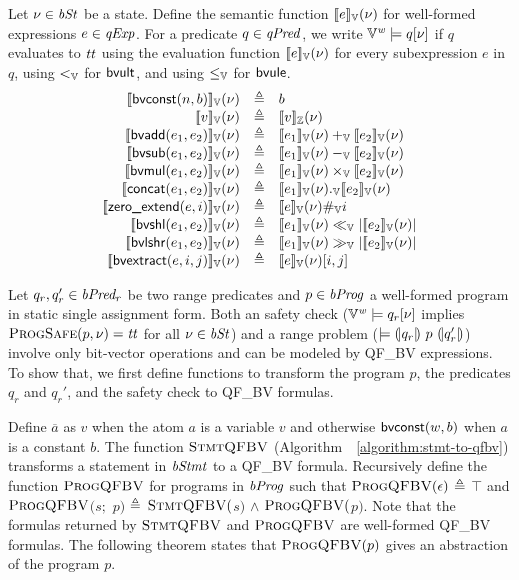 Let $\nu \in \mathit{bSt}$ be a state.
Define the semantic function $[\![{e}]\!]_{\mathbb{V}}(\nu)$ for well-formed expressions $e \in \mathit{qExp}$.
For a predicate $q \in \mathit{qPred}$, we write $\mathbb{V}^{\mathit{w}} \models q[\nu]$ if $q$ evaluates to $\mathit{tt}$ using the evaluation function $[\![{e}]\!]_{\mathbb{V}}(\nu)$ for every subexpression $e$ in $q$, using $<_{\mathbb{V}}$ for $\mbox{\textsf{bvult}}$, and using $\leq_{\mathbb{V}}$ for $\mbox{\textsf{bvule}}$.
\[
\begin{array}{rcl}
\bvvalueof{\bvconst(n, b)}(\bvst) & \defn & b \\
\bvvalueof{v}(\bvst) & \defn & \zvalueof{v}(\bvst) \\
\bvvalueof{\bvadd(e_1, e_2)}(\bvst) & \defn & \bvvalueof{e_1}(\bvst) +_\BV \bvvalueof{e_2}(\bvst) \\
\bvvalueof{\bvsub(e_1, e_2)}(\bvst) & \defn & \bvvalueof{e_1}(\bvst) -_\BV \bvvalueof{e_2}(\bvst) \\
\bvvalueof{\bvmul(e_1, e_2)}(\bvst) & \defn & \bvvalueof{e_1}(\bvst) \times_\BV \bvvalueof{e_2}(\bvst) \\
\bvvalueof{\bvconcat(e_1, e_2)}(\bvst) & \defn & \bvvalueof{e_1}(\bvst) ._\BV \bvvalueof{e_2}(\bvst) \\
\bvvalueof{\bvext(e, i)}(\bvst) & \defn & \bvvalueof{e}(\bvst) \#_\BV i \\
\bvvalueof{\bvshl(e_1, e_2)}(\bvst) & \defn & \bvvalueof{e_1}(\bvst) \ll_\BV |\bvvalueof{e_2}(\bvst)| \\
\bvvalueof{\bvlshr(e_1, e_2)}(\bvst) & \defn & \bvvalueof{e_1}(\bvst) \gg_\BV |\bvvalueof{e_2}(\bvst)| \\
\bvvalueof{\bvextract(e, i, j)}(\bvst) & \defn & \bvvalueof{e}(\bvst)[i, j] \\
\end{array}
\]

Let $q_r, q_r' \in \mathit{bPred_r}$ be two range predicates and $p \in \mathit{bProg}$ a well-formed program in static single assignment form.
Both an safety check ($\mathbb{V}^{\mathit{w}} \models q_r[\nu]$ implies $\textsc{ProgSafe}(p, \nu) = \mathit{tt}$ for all $\nu \in \mathit{bSt}$) and a range problem ($\models {(\!|}{q_r}{|\!)}~{p}~{(\!|}{q_r'}{|\!)}$) involve only bit-vector operations and can be modeled by QF\_BV expressions.
To show that, we first define functions to transform the program $p$, the predicates $q_r$ and $q_r'$, and the safety check to QF\_BV formulas.

Define $\overline{a}$ as $v$ when the atom $a$ is a variable $v$ and otherwise $\mbox{\textsf{bvconst}}(w, b)$ when $a$ is a constant $b$.
The function $\textsc{StmtQFBV}$ (Algorithm~~\ref{algorithm:stmt-to-qfbv}) transforms a statement in $\mathit{bStmt}$ to a QF\_BV formula.
Recursively define the function $\textsc{ProgQFBV}$ for programs in $\mathit{bProg}$ such that $\textsc{ProgQFBV}(\epsilon)$ $\triangleq$ $\top$ and $\textsc{ProgQFBV}$$(s;$ $p)$ $\triangleq$ $\textsc{StmtQFBV}($$s)$ $\land$ $\textsc{ProgQFBV}($$p)$.
Note that the formulas returned by $\textsc{StmtQFBV}$ and $\textsc{ProgQFBV}$ are well-formed QF\_BV formulas.
The following theorem states that $\textsc{ProgQFBV}(p)$ gives an abstraction of the program $p$.

